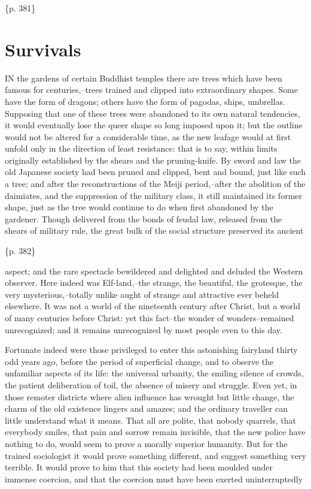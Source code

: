 \{p. 381\}

\section{Survivals}
\label{sec:org4f9a764}

IN the gardens of certain Buddhist temples there are trees which have been famous for centuries,--trees trained and clipped into extraordinary shapes. Some have the form of dragons; others have the form of pagodas, ships, umbrellas. Supposing that one of these trees were abandoned to its own natural tendencies, it would eventually lose the queer shape so long imposed upon it; but the outline would not be altered for a considerable time, as the new leafage would at first unfold only in the direction of least resistance: that is to say, within limits originally established by the shears and the pruning-knife. By sword and law the old Japanese society had been pruned and clipped, bent and bound, just like such a tree; and after the reconstructions of the Meiji period,--after the abolition of the daimiates, and the suppression of the military class, it still maintained its former shape, just as the tree would continue to do when first abandoned by the gardener. Though delivered from the bonds of feudal law, released from the shears of military rule, the great bulk of the social structure preserved its ancient

\{p. 382\}

aspect; and the rare spectacle bewildered and delighted and deluded the Western observer. Here indeed was Elf-land,--the strange, the beautiful, the grotesque, the very mysterious,--totally unlike aught of strange and attractive ever beheld elsewhere. It was not a world of the nineteenth century after Christ, but a world of many centuries before Christ: yet this fact--the wonder of wonders--remained unrecognized; and it remains unrecognized by most people even to this day.

Fortunate indeed were those privileged to enter this astonishing fairyland thirty odd years ago, before the period of superficial change, and to observe the unfamiliar aspects of its life: the universal urbanity, the smiling silence of crowds, the patient deliberation of toil, the absence of misery and struggle. Even yet, in those remoter districts where alien influence has wrought but little change, the charm of the old existence lingers and amazes; and the ordinary traveller can little understand what it means. That all are polite, that nobody quarrels, that everybody smiles, that pain and sorrow remain invisible, that the new police have nothing to do, would seem to prove a morally superior humanity. But for the trained sociologist it would prove something different, and suggest something very terrible. It would prove to him that this society had been moulded under immense coercion, and that the coercion must have been exerted uninterruptedly

